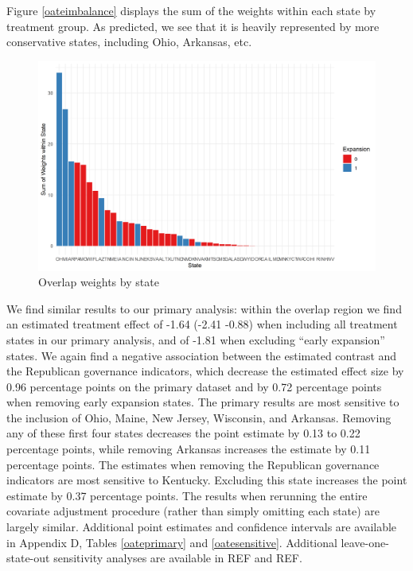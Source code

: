 \documentclass[12pt]{article}
\begin{document}
Figure \ref{oateimbalance} displays the sum of the weights within each state by treatment group. As predicted, we see that it is heavily represented by more conservative states, including Ohio, Arkansas, etc.

\begin{figure}[]
\begin{center}
    \includegraphics[scale=0.6]{01_Plots/oate-region.png}
    \caption{Overlap weights by state}
    \label{oatearea}
\end{center}
\end{figure}

We find similar results to our primary analysis: within the overlap region we find an estimated treatment effect of -1.64 (-2.41 -0.88) when including all treatment states in our primary analysis, and of -1.81 when excluding ``early expansion'' states. We again find a negative association between the estimated contrast and the Republican governance indicators, which decrease the estimated effect size by 0.96 percentage points on the primary dataset and by 0.72 percentage points when removing early expansion states. The primary results are most sensitive to the inclusion of Ohio, Maine, New Jersey, Wisconsin, and Arkansas. Removing any of these first four states decreases the point estimate by 0.13 to 0.22 percentage points, while removing Arkansas increases the estimate by 0.11 percentage points. The estimates when removing the Republican governance indicators are most sensitive to Kentucky. Excluding this state increases the point estimate by 0.37 percentage points. The results when rerunning the entire covariate adjustment procedure (rather than simply omitting each state) are largely similar. Additional point estimates and confidence intervals are available in Appendix D, Tables \ref{oateprimary} and \ref{oatesensitive}. Additional leave-one-state-out sensitivity analyses are available in REF and REF.
\end{document}
